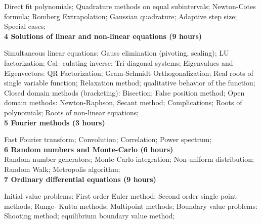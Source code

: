 \documentclass[12pt]{article}
\begin{document}
Direct fit polynomials; Quadrature methods on equal subintervals; Newton-Cotes formula;
Romberg Extrapolation; Gaussian quadrature; Adaptive step size; Special cases;
\\

\textbf{4
Solutions of linear and non-linear equations (9 hours)}

Simultaneous linear equations: Gauss elimination (pivoting, scaling); LU factorization; Cal-
culating inverse; Tri-diagonal systems; Eigenvalues and Eigenvectors: QR Factorization;
Gram-Schmidt Orthogonalization; Real roots of single variable function; Relaxation method;
qualitative behavior of the function; Closed domain methods (bracketing): Bisection; False
position method; Open domain methods: Newton-Raphson, Secant method; Complications;
Roots of polynomials; Roots of non-linear equations;
\\

\textbf{5
Fourier methods (3 hours)}

Fast Fourier transform; Convolution; Correlation; Power spectrum;
\\

\textbf{6
Random numbers and Monte-Carlo (6 hours)}\\
Random number generators; Monte-Carlo integration; Non-uniform distribution; Random
Walk; Metropolis algorithm;
\\

\textbf{7
Ordinary differential equations (9 hours)}

Initial value problems: First order Euler method; Second order single point methods; Runge-
Kutta methods; Multipoint methods; Boundary value problems: Shooting method; equilibrium boundary value method;
\\
\end{document}
